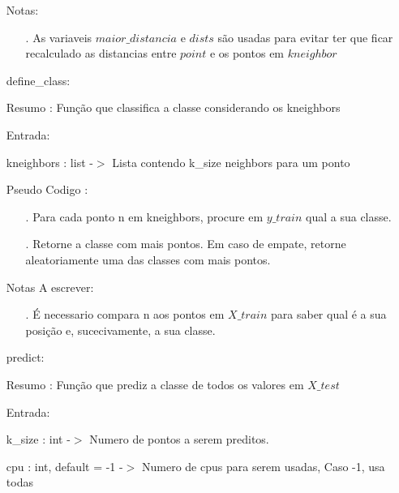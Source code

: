 \documentclass{article}
\begin{document}
\begin{enumerate}
\begin{enumerate}
\begin{enumerate}
			\end{enumerate}
		
	
		\end{enumerate}
		
		\quad Notas:

		\begin{enumerate}
	
		\item[.] As variaveis $maior\_distancia$ e $dists$ são usadas para evitar ter que ficar recalculado as distancias entre $point$ e os pontos em $kneighbor$ 

		\end{enumerate}

	\item[] define\_class: 
	
		\quad Resumo : Função que classifica a classe considerando os kneighbors

		\quad Entrada: 
	
			\qquad kneighbors : list -$>$  Lista contendo k\_size neighbors para um ponto
	
		\quad Pseudo Codigo :
		
		\begin{enumerate}
	
		\item[.] Para cada ponto n em kneighbors, procure em $y\_train$ qual a sua classe.
		\item[.] Retorne a classe com mais pontos. Em caso de empate, retorne aleatoriamente uma das classes com mais pontos.
	
		\end{enumerate}
		
		\quad Notas A escrever:

		\begin{enumerate}
	
		\item[.] É necessario compara n aos pontos em $X\_train$ para saber qual é a sua posição e, sucecivamente, a sua classe.

		\end{enumerate}

	\item[] predict: 
	
		\quad Resumo : Função que prediz a classe de todos os valores em $X\_test$

		\quad Entrada: 
	
			\qquad k\_size : int -$>$ Numero de pontos a serem preditos.
	
			\qquad cpu : int, default = -1 -$>$ Numero de cpus para serem usadas, Caso -1, usa todas
	

\end{enumerate}
\end{document}

